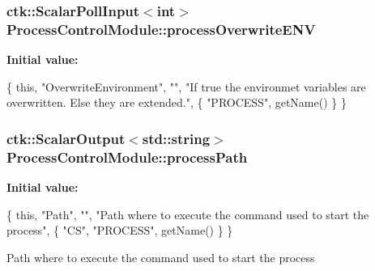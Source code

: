 \subsubsection[{\texorpdfstring{process\+Overwrite\+E\+NV}{processOverwriteENV}}]{\setlength{\rightskip}{0pt plus 5cm}ctk\+::\+Scalar\+Poll\+Input$<$int$>$ Process\+Control\+Module\+::process\+Overwrite\+E\+NV}\hypertarget{structProcessControlModule_ac858a14ada8c35c55e01258122eb20b8}{}\label{structProcessControlModule_ac858a14ada8c35c55e01258122eb20b8}
{\bfseries Initial value\+:}
\begin{DoxyCode}
\{ \textcolor{keyword}{this}, \textcolor{stringliteral}{"OverwriteEnvironment"}, \textcolor{stringliteral}{""},
    \textcolor{stringliteral}{"If true the environmet variables are overwritten. Else they are extended."},
    \{ \textcolor{stringliteral}{"PROCESS"}, getName() \} \}
\end{DoxyCode}
\subsubsection[{\texorpdfstring{process\+Path}{processPath}}]{\setlength{\rightskip}{0pt plus 5cm}ctk\+::\+Scalar\+Output$<$std\+::string$>$ Process\+Control\+Module\+::process\+Path}\hypertarget{structProcessControlModule_a3910651f5e7ce2762a183b5917e0c1a2}{}\label{structProcessControlModule_a3910651f5e7ce2762a183b5917e0c1a2}
{\bfseries Initial value\+:}
\begin{DoxyCode}
\{ \textcolor{keyword}{this}, \textcolor{stringliteral}{"Path"}, \textcolor{stringliteral}{""},
      \textcolor{stringliteral}{"Path where to execute the command used to start the process"},
    \{  \textcolor{stringliteral}{"CS"}, \textcolor{stringliteral}{"PROCESS"}, getName() \} \}
\end{DoxyCode}
Path where to execute the command used to start the process 
